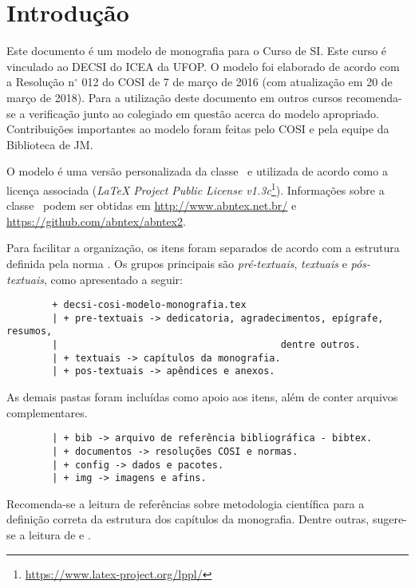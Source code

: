 \chapter{Introdução}
\label{cap:introducao}

Este documento é um modelo de monografia para o Curso de \acf{SI}. Este curso é vinculado ao \acf{DECSI} do \acf{ICEA} da \acf{UFOP}. O modelo foi elaborado de acordo com a Resolução n$^\circ$ 012 do \acf{COSI} de 7 de março de 2016 (com atualização em 20 de março de 2018). Para a utilização deste documento em outros cursos recomenda-se a verificação junto ao colegiado em questão acerca do modelo apropriado. Contribuições importantes ao modelo foram feitas pelo COSI e pela equipe da Biblioteca de \acf{JM}.

O modelo é uma versão personalizada da classe \abnTeX\ e utilizada de acordo como a licença associada (\textit{LaTeX Project Public License v1.3c}\footnote{\url{https://www.latex-project.org/lppl/}}). Informações sobre a classe \abnTeX\ podem ser obtidas em \url{http://www.abntex.net.br/} e \url{https://github.com/abntex/abntex2}.

Para facilitar a organização, os itens foram separados de acordo com a estrutura definida pela norma . Os grupos principais são \textit{pré-textuais}, \textit{textuais} e \textit{pós-textuais}, como apresentado a seguir:

\begin{verbatim}
		+ decsi-cosi-modelo-monografia.tex
		| + pre-textuais -> dedicatoria, agradecimentos, epígrafe, resumos,
		|										dentre outros.
		| + textuais -> capítulos da monografia.
		| + pos-textuais -> apêndices e anexos.
\end{verbatim}

As demais pastas foram incluídas como apoio aos itens, além de conter arquivos complementares.

\begin{verbatim}
		| + bib -> arquivo de referência bibliográfica - bibtex.
		| + documentos -> resoluções COSI e normas.
		| + config -> dados e pacotes.
		| + img -> imagens e afins.
\end{verbatim}

Recomenda-se a leitura de referências sobre metodologia científica para a definição correta da estrutura dos capítulos da monografia. Dentre outras, sugere-se a leitura de  e .

